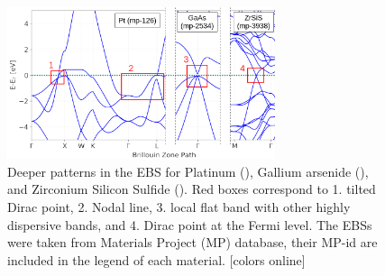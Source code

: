 \documentclass[article]{elsarticle}
\begin{document}
\begin{figure}[H]
    \centering
    \includegraphics[width=0.7\textwidth]{Figures/band-structure-features.png}
    \caption{Deeper patterns in the EBS for Platinum (), Gallium arsenide (), and Zirconium Silicon Sulfide (). Red boxes correspond to 1. tilted Dirac point, 2. Nodal line, 3. local flat band with other highly dispersive bands, and 4. Dirac point at the Fermi level. The EBSs were taken from Materials Project (MP) database,\cite{Jain2013} their MP-id are included in the legend of each material. [colors online]}
    \label{fig:EBS_deeper_patterns}
\end{figure}
\end{document}
